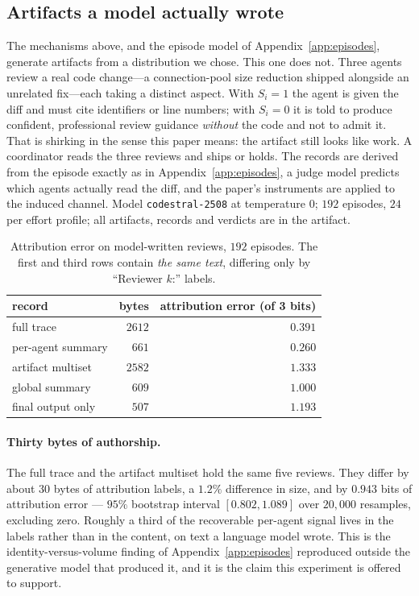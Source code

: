 \subsection{Artifacts a model actually wrote}
\label{sec:llm}

The mechanisms above, and the episode model of Appendix~\ref{app:episodes},
generate artifacts from a distribution we chose. This one does not. Three agents
review a real code change---a connection-pool size reduction shipped alongside an
unrelated fix---each taking a distinct aspect. With $S_i = 1$ the agent is given
the diff and must cite identifiers or line numbers; with $S_i = 0$ it is told to
produce confident, professional review guidance \emph{without} the code and not
to admit it. That is shirking in the sense this paper means: the artifact still
looks like work. A coordinator reads the three reviews and ships or holds. The
records are derived from the episode exactly as in
Appendix~\ref{app:episodes}, a judge model predicts which agents actually read
the diff, and the paper's instruments are applied to the induced channel. Model
\texttt{codestral-2508} at temperature $0$; $192$ episodes, $24$ per effort
profile; all artifacts, records and verdicts are in the artifact.

\begin{table}[t]
\centering
\caption{Attribution error on model-written reviews, $192$ episodes. The first
and third rows contain \emph{the same text}, differing only by ``Reviewer $k$:''
labels.}
\label{tab:llm}
\small
\begin{tabular}{@{}lrr@{}}
\toprule
record & bytes & attribution error (of 3 bits) \\
\midrule
full trace              & $2612$ & $0.391$ \\
per-agent summary       & $661$  & $0.260$ \\
artifact multiset       & $2582$ & $1.333$ \\
global summary          & $609$  & $1.000$ \\
final output only       & $507$  & $1.193$ \\
\bottomrule
\end{tabular}
\end{table}

\paragraph{Thirty bytes of authorship.}
The full trace and the artifact multiset hold the same five reviews. They differ
by about $30$ bytes of attribution labels, a $1.2\%$ difference in size, and by
$0.943$ bits of attribution error --- $95\%$ bootstrap interval
$[0.802, 1.089]$ over $20{,}000$ resamples, excluding zero. Roughly a third of
the recoverable per-agent signal lives in the labels rather than in the content,
on text a language model wrote. This is the identity-versus-volume finding of
Appendix~\ref{app:episodes} reproduced outside the generative model that produced
it, and it is the claim this experiment is offered to support.

